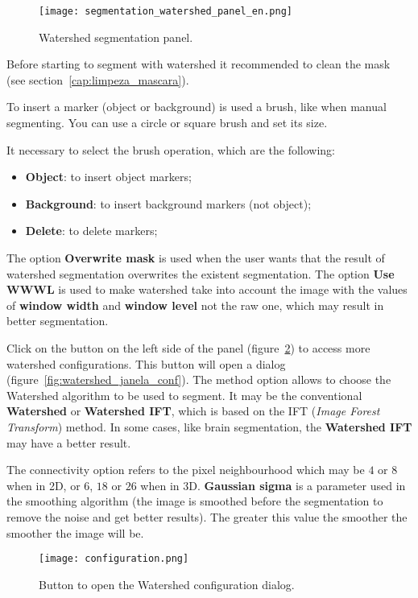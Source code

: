 \begin{figure}[!htb]
\centering
\texttt{[image: segmentation\_watershed\_panel\_en.png]}
\caption{Watershed segmentation panel.}
\label{fig:watershed_painel}
\end{figure}

Before starting to segment with watershed it recommended to clean the mask (see section~\ref{cap:limpeza_mascara}).

To insert a marker (object or background) is used a brush, like when manual segmenting. You can use a circle or square brush and set its size.

It necessary to select the brush operation, which are the following:
\begin{itemize}
    \item \textbf{Object}: to insert object markers;
    \item \textbf{Background}: to insert background markers (not object);
    \item \textbf{Delete}: to delete markers;
\end{itemize}


The option \textbf{Overwrite mask} is used when the user wants that the result of watershed segmentation overwrites the existent segmentation. The option \textbf{Use WWWL} is used to make watershed take into account the image with the values of \textbf{window width} and \textbf{window level} not the raw one, which may result in better segmentation.

Click on the button on the left side of the panel (figure~\ref{fig:watershed_conf}) to access more watershed configurations. This button will open a dialog (figure~\ref{fig:watershed_janela_conf}). The method option allows to choose the Watershed algorithm to be used to segment. It may be the conventional \textbf{Watershed} or \textbf{Watershed IFT}, which is based on the IFT (\textit{Image Forest Transform}) method. In some cases, like brain segmentation, the \textbf{Watershed IFT} may have a better result.

The connectivity option refers to the pixel neighbourhood which may be $4$ or $8$ when in 2D,  or $6$, $18$ or $26$ when in 3D. \textbf{Gaussian sigma} is a parameter used in the smoothing algorithm (the image is smoothed before the segmentation to remove the noise and get better results). The greater this value the smoother the smoother the image will be.

\begin{figure}[!htb]
    \centering
    \texttt{[image: configuration.png]}
    \caption{Button to open the Watershed configuration dialog.}
    \label{fig:watershed_conf}
\end{figure}

